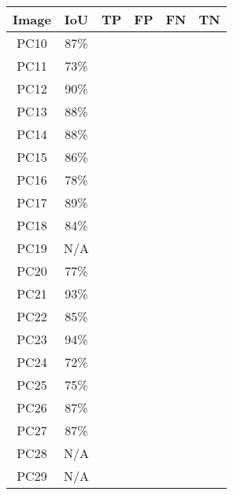 \documentclass{article}  %
\begin{document}
	\begin{center}
		\begin{tabular}{| c | c | c | c | c | c |}
			\hline
			\textbf{Image} & \textbf{IoU} & \textbf{TP} & \textbf{FP} & \textbf{FN} & \textbf{TN} \\
			\hline
			PC10 & 87\% & \checkmark & & & \\
			\hline
			PC11 & 73\% & \checkmark & & & \\
			\hline
			PC12 & 90\% & \checkmark & & & \\
			\hline
			PC13 & 88\% & \checkmark & & & \\
			\hline
			PC14 & 88\% & \checkmark & & & \\
			\hline
			PC15 & 86\% & \checkmark & & & \\
			\hline
			PC16 & 78\% & \checkmark & & & \\
			\hline
			PC17 & 89\% & \checkmark & & & \\
			\hline
			PC18 & 84\% & \checkmark & & & \\
			\hline
			PC19 & N/A & & & & \checkmark \\
			\hline
			PC20 & 77\% & \checkmark & & & \\
			\hline
			PC21 & 93\% & \checkmark & & & \\
			\hline
			PC22 & 85\% & \checkmark & & & \\
			\hline
			PC23 & 94\% & \checkmark & & & \\
			\hline
			PC24 & 72\% & \checkmark & & & \\
			\hline
			PC25 & 75\% & \checkmark & & & \\
			\hline
			PC26 & 87\% & \checkmark & & & \\
			\hline
			PC27 & 87\% & \checkmark & & & \\
			\hline
			PC28 & N/A & & & & \checkmark \\
			\hline
			PC29 & N/A & & & & \checkmark \\
			\hline
		\end{tabular}
	\end{center}
	
\end{document}
